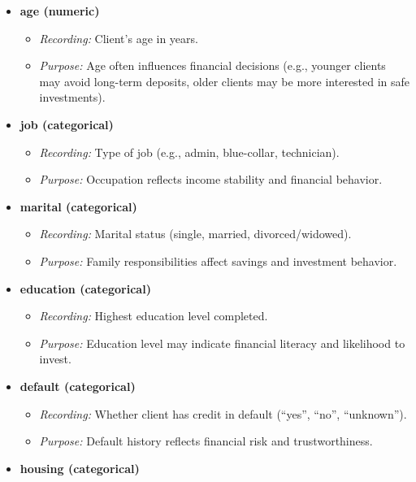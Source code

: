 \documentclass[
]{article}
\providecommand{\tightlist}{%
  \setlength{\itemsep}{0pt}\setlength{\parskip}{0pt}}
\begin{document}
\begin{itemize}
\tightlist
\item
  \textbf{age (numeric)}

  \begin{itemize}
  \tightlist
  \item
    \emph{Recording:} Client's age in years.\\
  \item
    \emph{Purpose:} Age often influences financial decisions (e.g.,
    younger clients may avoid long-term deposits, older clients may be
    more interested in safe investments).
  \end{itemize}
\item
  \textbf{job (categorical)}

  \begin{itemize}
  \tightlist
  \item
    \emph{Recording:} Type of job (e.g., admin, blue-collar,
    technician).\\
  \item
    \emph{Purpose:} Occupation reflects income stability and financial
    behavior.
  \end{itemize}
\item
  \textbf{marital (categorical)}

  \begin{itemize}
  \tightlist
  \item
    \emph{Recording:} Marital status (single, married,
    divorced/widowed).\\
  \item
    \emph{Purpose:} Family responsibilities affect savings and
    investment behavior.
  \end{itemize}
\item
  \textbf{education (categorical)}

  \begin{itemize}
  \tightlist
  \item
    \emph{Recording:} Highest education level completed.\\
  \item
    \emph{Purpose:} Education level may indicate financial literacy and
    likelihood to invest.
  \end{itemize}
\item
  \textbf{default (categorical)}

  \begin{itemize}
  \tightlist
  \item
    \emph{Recording:} Whether client has credit in default (``yes'',
    ``no'', ``unknown'').\\
  \item
    \emph{Purpose:} Default history reflects financial risk and
    trustworthiness.
  \end{itemize}
\item
  \textbf{housing (categorical)}


\end{itemize}
\end{document}
